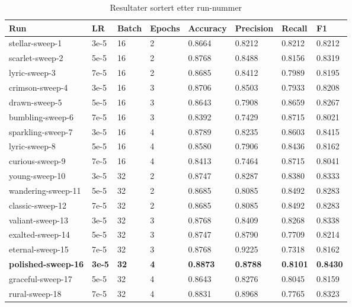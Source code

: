 \begin{table}
\caption{Resultater sortert etter run-nummer}
\label{tab:results}
\begin{tabular}{llllllll}
\toprule
Run & LR & Batch & Epochs & Accuracy & Precision & Recall & F1 \\
\midrule
stellar-sweep-1 & 3e-5 & 16 & 2 & 0.8664 & 0.8212 & 0.8212 & 0.8212 \\
scarlet-sweep-2 & 5e-5 & 16 & 2 & 0.8768 & 0.8488 & 0.8156 & 0.8319 \\
lyric-sweep-3 & 7e-5 & 16 & 2 & 0.8685 & 0.8412 & 0.7989 & 0.8195 \\
crimson-sweep-4 & 3e-5 & 16 & 3 & 0.8706 & 0.8503 & 0.7933 & 0.8208 \\
drawn-sweep-5 & 5e-5 & 16 & 3 & 0.8643 & 0.7908 & 0.8659 & 0.8267 \\
bumbling-sweep-6 & 7e-5 & 16 & 3 & 0.8392 & 0.7429 & 0.8715 & 0.8021 \\
sparkling-sweep-7 & 3e-5 & 16 & 4 & 0.8789 & 0.8235 & 0.8603 & 0.8415 \\
lyric-sweep-8 & 5e-5 & 16 & 4 & 0.8580 & 0.7906 & 0.8436 & 0.8162 \\
curious-sweep-9 & 7e-5 & 16 & 4 & 0.8413 & 0.7464 & 0.8715 & 0.8041 \\
young-sweep-10 & 3e-5 & 32 & 2 & 0.8747 & 0.8287 & 0.8380 & 0.8333 \\
wandering-sweep-11 & 5e-5 & 32 & 2 & 0.8685 & 0.8085 & 0.8492 & 0.8283 \\
classic-sweep-12 & 7e-5 & 32 & 2 & 0.8685 & 0.8085 & 0.8492 & 0.8283 \\
valiant-sweep-13 & 3e-5 & 32 & 3 & 0.8768 & 0.8409 & 0.8268 & 0.8338 \\
exalted-sweep-14 & 5e-5 & 32 & 3 & 0.8747 & 0.8790 & 0.7709 & 0.8214 \\
eternal-sweep-15 & 7e-5 & 32 & 3 & 0.8768 & 0.9225 & 0.7318 & 0.8162 \\
\textbf{polished-sweep-16} & \textbf{3e-5} & \textbf{32} & \textbf{4} & \textbf{0.8873} & \textbf{0.8788} & \textbf{0.8101} & \textbf{0.8430} \\
graceful-sweep-17 & 5e-5 & 32 & 4 & 0.8643 & 0.8276 & 0.8045 & 0.8159 \\
rural-sweep-18 & 7e-5 & 32 & 4 & 0.8831 & 0.8968 & 0.7765 & 0.8323 \\
\bottomrule
\end{tabular}
\end{table}
